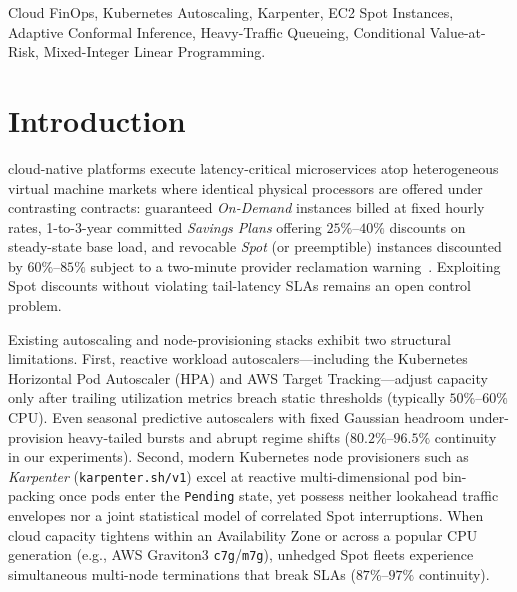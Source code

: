 \documentclass[journal]{IEEEtran}
\begin{document}
\begin{IEEEkeywords}
Cloud FinOps, Kubernetes Autoscaling, Karpenter, EC2 Spot Instances, Adaptive Conformal Inference, Heavy-Traffic Queueing, Conditional Value-at-Risk, Mixed-Integer Linear Programming.
\end{IEEEkeywords}

\section{Introduction}

 cloud-native platforms execute latency-critical microservices atop heterogeneous virtual machine markets where identical physical processors are offered under contrasting contracts: guaranteed \emph{On-Demand} instances billed at fixed hourly rates, 1-to-3-year committed \emph{Savings Plans} offering $25\%$--$40\%$ discounts on steady-state base load, and revocable \emph{Spot} (or preemptible) instances discounted by $60\%$--$85\%$ subject to a two-minute provider reclamation warning~\cite{sharma2016flint,ambati2020providing}. Exploiting Spot discounts without violating tail-latency SLAs remains an open control problem.

Existing autoscaling and node-provisioning stacks exhibit two structural limitations. First, reactive workload autoscalers---including the Kubernetes Horizontal Pod Autoscaler (HPA) and AWS Target Tracking---adjust capacity only after trailing utilization metrics breach static thresholds (typically $50\%$--$60\%$ CPU). Even seasonal predictive autoscalers with fixed Gaussian headroom under-provision heavy-tailed bursts and abrupt regime shifts ($80.2\%$--$96.5\%$ continuity in our experiments). Second, modern Kubernetes node provisioners such as \emph{Karpenter} (\texttt{karpenter.sh/v1}) excel at reactive multi-dimensional pod bin-packing once pods enter the \texttt{Pending} state, yet possess neither lookahead traffic envelopes nor a joint statistical model of correlated Spot interruptions. When cloud capacity tightens within an Availability Zone or across a popular CPU generation (e.g., AWS Graviton3 \texttt{c7g}/\texttt{m7g}), unhedged Spot fleets experience simultaneous multi-node terminations that break SLAs ($87\%$--$97\%$ continuity).
\end{document}

